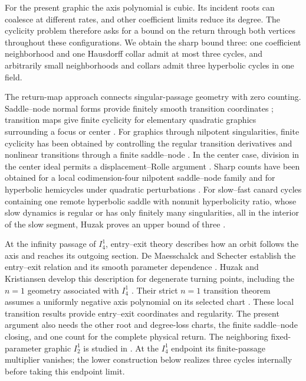 \documentclass[a4paper,11pt]{article}
\numberwithin{equation}{section}
\theoremstyle{definition}
\theoremstyle{remark}
\begin{document}
For the present graphic the axis polynomial is cubic. Its incident
roots can coalesce at different rates, and other coefficient limits
reduce its degree. The cyclicity problem therefore asks for a bound on
the return through both vertices throughout these configurations.
We obtain the sharp bound three: one coefficient neighborhood and one
Hausdorff collar admit at most three cycles, and arbitrarily small
neighborhoods and collars admit three hyperbolic cycles in one field.

The return-map approach connects singular-passage geometry with zero
counting. Saddle--node normal forms provide finitely smooth transition
coordinates \cite{DIR02}; transition maps give finite cyclicity for
elementary quadratic graphics surrounding a focus or center
\cite{DGR02}. For graphics through nilpotent singularities, finite
cyclicity has been obtained by controlling the regular transition
derivatives \cite[Theorems~5.4 and~6.3, journal pp.~372 and 388--389]{ZR02}
and nonlinear transitions through a finite saddle--node
\cite[Theorem~3.8, author copy p.~23]{RZ04}. In the center case,
division in the center ideal permits a displacement--Rolle argument
\cite[Sections~5.1 and 5.4--6, author copy pp.~19 and 23--25]{RR08}.
Sharp counts have been obtained for a local
codimension-four nilpotent saddle--node family
\cite[Theorem~1.1, peer-reviewed author version p.~4]{Huzak17JDE}
and for hyperbolic hemicycles under quadratic perturbations
\cite[Definition~1.4 and Theorem~B, published pp.~3 and 7]{MV25}.
For slow--fast canard cycles containing one remote hyperbolic saddle
with nonunit hyperbolicity ratio, whose slow dynamics is regular or
has only finitely many singularities, all in the interior of the slow
segment, Huzak proves an upper bound of three
\cite[Definition~1 and Theorem~2.2, peer-reviewed author version
pp.~7--8]{Huzak22}.

At the infinity passage of $I_4^1$, entry--exit theory describes how an
orbit follows the axis and reaches its outgoing section.
De Maesschalck and Schecter establish the entry--exit relation and its
smooth parameter dependence \cite[Theorem~1.1 and Corollary~1.2]{DMS16}.
Huzak and Kristiansen develop this description for degenerate turning
points, including the $n=1$ geometry associated with $I_4^1$
\cite[printed p.~3 and Theorem~6.1, printed p.~25]{HK26}.
Their strict $n=1$ transition theorem assumes a uniformly negative
axis polynomial on its selected chart
\cite[Theorem~2.4, printed pp.~6--7]{HK26}. These local transition
results provide entry--exit coordinates and regularity. The present
argument also needs the other root and degree-loss charts, the finite
saddle--node closing, and one count for the complete physical return.
The neighboring fixed-parameter graphic $I_2^1$ is studied in
\cite{Lu26I21}. At the $I_4^1$ endpoint its finite-passage multiplier
vanishes; the lower construction below realizes three cycles internally
before taking this endpoint limit.
\end{document}
